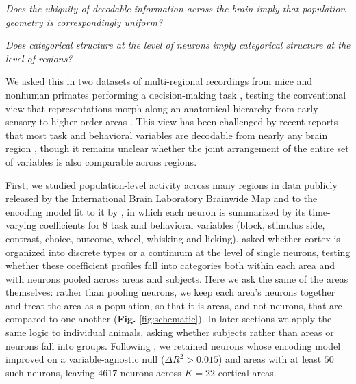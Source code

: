 \textit{Does the ubiquity of decodable information across the brain imply that population geometry is correspondingly uniform?} 

\textit{Does categorical structure at the level of neurons imply categorical
structure at the level of regions?}

We asked this in two datasets of multi-regional recordings from mice and nonhuman primates performing a decision-making task \parencite{angelaki2025brain,Siegel2015-cz}, testing the conventional view that representations morph along an anatomical hierarchy from early sensory to higher-order areas \parencite{petersen2024principles}. This view has been challenged by recent reports that most task and behavioral variables are decodable from nearly any brain region \parencite{findling2025brain,angelaki2025brain, Lloreda2025,rosen2026distributed}, though it remains unclear whether the joint arrangement of the entire set of variables is also comparable across regions.


First, we studied population-level activity across many regions in data publicly released by the International Brain Laboratory Brainwide Map \parencite{angelaki2025brain} and to the encoding model fit to it by \textcite{posani2026}, in which each neuron is summarized by its time-varying coefficients for $8$ task and behavioral variables (block, stimulus side, contrast, choice, outcome, wheel, whisking and licking). \textcite{posani2026} asked whether cortex is organized into discrete types or a continuum at the level of single neurons, testing whether these coefficient profiles fall into categories both within each area and with neurons pooled across areas and subjects. Here we ask the same of the areas themselves: rather than pooling neurons, we keep each area's neurons together and treat the area as a population, so that it is areas, and not neurons, that are compared to one another (\textbf{Fig. }\ref{fig:schematic}). In later sections we apply the same logic to individual animals, asking whether subjects rather than areas or neurons fall into groups. Following \textcite{posani2026}, we retained neurons whose encoding model improved on a variable-agnostic null ($\Delta R^2 > 0.015$) and areas with at least $50$ such neurons, leaving $4617$ neurons across $K = 22$ cortical areas. 

